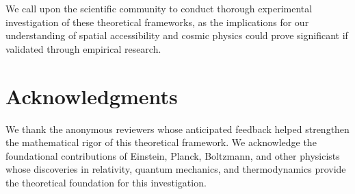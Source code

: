 \documentclass[12pt,a4paper]{article}
\begin{document}
We call upon the scientific community to conduct thorough experimental investigation of these theoretical frameworks, as the implications for our understanding of spatial accessibility and cosmic physics could prove significant if validated through empirical research.

\section*{Acknowledgments}

We thank the anonymous reviewers whose anticipated feedback helped strengthen the mathematical rigor of this theoretical framework. We acknowledge the foundational contributions of Einstein, Planck, Boltzmann, and other physicists whose discoveries in relativity, quantum mechanics, and thermodynamics provide the theoretical foundation for this investigation.
\end{document}
